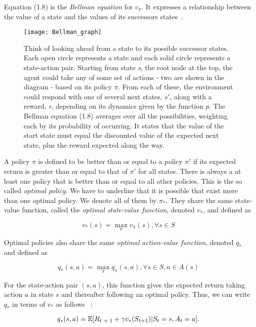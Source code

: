 Equation (1.8) is the \textit{Bellman equation} for $v_\pi$. It expresses a relationship between the value of a state and the values of its successors states~\cite{SuttonBarto}.

\begin{center}
  \begin{figure}[h!]
  \texttt{[image: Bellman\_graph]}
    \caption{Think of looking ahead from a state to its possible successor states. Each open circle represents a state and each solid circle represents a state-action pair. Starting from state \textit{s}, the root node at the top, the agent could take any of some set of actions - two are shown in the diagram - based on its policy $\pi$. From each of these, the environment could respond with one of several next states, $s'$, along with a reward, \textit{r}, depending on its dynamics given by the function \textit{p}. The Bellman equation (1.8) averages over all the possibilities, weighting each by its probability of occurring. It states that the value of the start state must equal the discounted value of the expected next state, plus the reward expected along the way.}
    \label{fig:Bellman_graph}
  \end{figure}
\end{center}

\break \break \break

A policy $\pi$ is defined to be better than or equal to a policy $\pi'$ if its expected return is greater than or equal to that of $\pi'$ for all states. There is always a at least one policy that is better than or equal to all other policies. This is the so called \textit{optimal policy}. We have to underline that it is possible that exist more than one optimal policy. We denote all of them by $\pi_*$. They share the same state-value function, called the \textit{optimal state-value function}, denoted $v_*$, and defined as

\begin{equation}
  v_*(s) = \max\limits_{\pi} v_\pi(s), \forall s \in S
\end{equation}

Optimal policies also share the same \textit{optimal action-value function}, denoted $q_*$ and defined as

\begin{equation}
  q_*(s, a) = \max\limits_{\pi}q_\pi(s, a), \forall s\in S, a\in A(s)
\end{equation}

For the state-action pair $(s, a)$, this function gives the expected return taking action $a$ in state $s$ and thereafter following an optimal policy. Thus, we can write $q_*$ in terms of $v_*$ as follows~\cite{SuttonBarto} :

\begin{equation}
  q_*(s, a) = \mathbb{E}[R\textsubscript{t + 1} + \gamma v_*(S\textsubscript{t+1})|S_t = s, A_t = a].
\end{equation}
